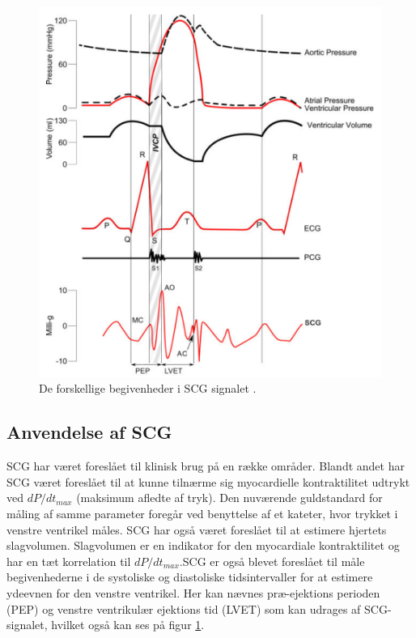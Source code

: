 \begin{figure}[H] %
\begin{center}
\includegraphics[width=1\textwidth]{figures/wigger}
\end{center}
\caption{De forskellige begivenheder i SCG signalet \cite{zanetti}.}
\label{fig:wigger}
\end{figure}

\newpage
\subsection{Anvendelse af SCG}
SCG har været foreslået til klinisk brug på en række områder. Blandt andet har SCG været foreslået til at kunne tilnærme sig myocardielle kontraktilitet udtrykt ved $dP/dt_{max}$ (maksimum afledte af tryk). Den nuværende guldstandard for måling af samme parameter foregår ved benyttelse af et kateter, hvor trykket i venstre ventrikel måles. SCG har også været foreslået til at estimere hjertets slagvolumen. Slagvolumen er en indikator for den myocardiale kontraktilitet og har en tæt korrelation til $dP/dt_{max}$.SCG er også blevet foreslået til måle begivenhederne i de systoliske og diastoliske tidsintervaller for at estimere ydeevnen for den venstre ventrikel. Her kan nævnes  præ-ejektions perioden (PEP) og venstre ventrikulær ejektions tid (LVET) som kan udrages af SCG-signalet, hvilket også kan ses på figur \ref{fig:wigger}. 

